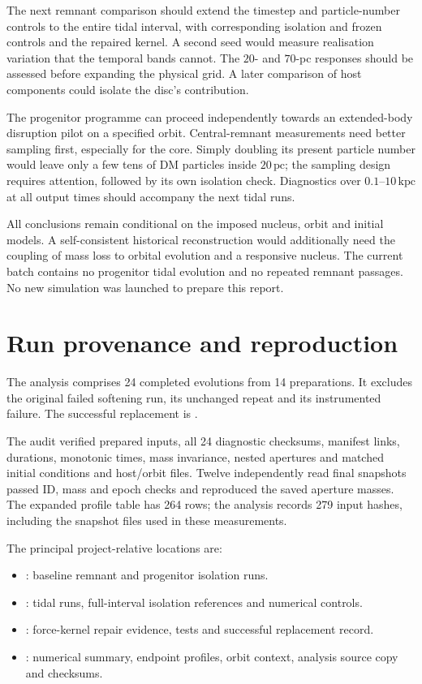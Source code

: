 \documentclass[11pt,a4paper]{article}
\newcommand{\pc}{\,\mathrm{pc}}
\newcommand{\kpc}{\,\mathrm{kpc}}
\begin{document}
The next remnant comparison should extend the timestep and particle-number
controls to the entire tidal interval, with corresponding isolation and
frozen controls and the repaired kernel. A second seed would measure
realisation variation that the temporal bands cannot. The $20$- and $70$-pc
responses should be assessed before expanding the physical grid. A later
comparison of host components could isolate the disc's contribution.

The progenitor programme can proceed independently towards an extended-body
disruption pilot on a specified orbit. Central-remnant measurements need
better sampling first, especially for the core. Simply doubling its present
particle number would leave only a few tens of DM particles inside $20\pc$;
the sampling design requires attention, followed by its own isolation check.
Diagnostics over $0.1$--$10\kpc$ at all output times should accompany the
next tidal runs.

All conclusions remain conditional on the imposed nucleus, orbit and initial
models. A self-consistent historical reconstruction would additionally need
the coupling of mass loss to orbital evolution and a responsive nucleus.
The current batch contains no progenitor tidal evolution and no repeated
remnant passages. No new simulation was launched to prepare this report.

\appendix
\section{Run provenance and reproduction}
\begingroup\small
\setlength{\parskip}{1pt}

The analysis comprises 24 completed evolutions from 14 preparations. It
excludes the original failed softening run, its unchanged repeat and its
instrumented failure. The successful replacement is
.

The audit verified prepared inputs, all 24 diagnostic checksums, manifest
links, durations, monotonic times, mass invariance, nested apertures and matched
initial conditions and host/orbit files. Twelve independently read final
snapshots passed ID, mass and epoch checks and reproduced the saved aperture
masses. The expanded profile table has 264 rows; the analysis records 279
input hashes, including the snapshot files used in these measurements.

The principal project-relative locations are:
\begin{itemize}
 \setlength{\itemsep}{0pt}
 \item {}: baseline remnant
 and progenitor isolation runs.
 \item {}: tidal runs,
 full-interval isolation references and numerical controls.
 \item {}: force-kernel repair
 evidence, tests and successful replacement record.
 \item {}: numerical summary,
 endpoint profiles, orbit context, analysis source copy and checksums.
\end{itemize}
\end{document}
